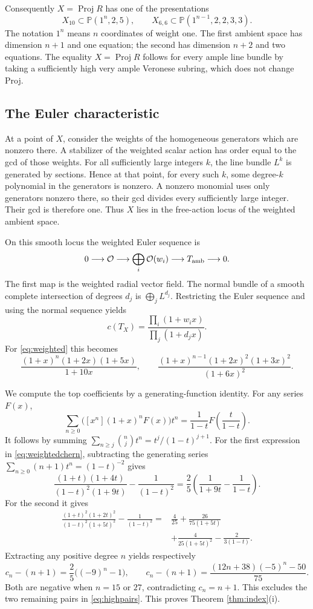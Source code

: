 \documentclass[11pt,reqno,letterpaper]{amsart}
\newcommand{\PP}{\mathbb P}
\newcommand{\Proj}{\operatorname{Proj}}
\newcommand{\OO}{\mathcal O}
\theoremstyle{definition}
\numberwithin{equation}{section}
\begin{document}
Consequently $X=\Proj R$ has one of the presentations
\begin{equation}\label{eq:weighted}
 X_{10}\subset\PP(1^n,2,5),\qquad
 X_{6,6}\subset\PP(1^{n-1},2,2,3,3).
\end{equation}
The notation $1^n$ means $n$ coordinates of weight one.
The first ambient space has dimension $n+1$ and one equation;
the second has dimension $n+2$ and two equations.
The equality $X=\Proj R$ follows for every ample line bundle by taking a
sufficiently high very ample Veronese subring, which does not change Proj.

\subsection{The Euler characteristic}
At a point of $X$, consider the weights of the homogeneous generators
which are nonzero there. A stabilizer of the weighted scalar action has
order equal to the gcd of those weights.
For all sufficiently large integers $k$, the line bundle $L^k$ is generated
by sections. Hence at that point, for every such $k$, some degree-$k$
polynomial in the generators is nonzero. A nonzero monomial uses only
generators nonzero there, so their gcd divides every sufficiently large
integer. Their gcd is therefore one.
Thus $X$ lies in the free-action locus of the weighted ambient space.

On this smooth locus the weighted Euler sequence is
\[
 0\longrightarrow\OO\longrightarrow\bigoplus_i\OO(w_i)
 \longrightarrow T_{\rm amb}\longrightarrow0.
\]
The first map is the weighted radial vector field.
The normal bundle of a smooth complete intersection of degrees $d_j$
is $\bigoplus_j L^{d_j}$. Restricting the Euler sequence and using the
normal sequence yields
\[
 c(T_X)=\frac{\prod_i(1+w_i x)}{\prod_j(1+d_j x)}.
\]
For \eqref{eq:weighted} this becomes
\begin{equation}\label{eq:weightedchern}
 \frac{(1+x)^n(1+2x)(1+5x)}{1+10x},
 \qquad
 \frac{(1+x)^{n-1}(1+2x)^2(1+3x)^2}{(1+6x)^2}.
\end{equation}

We compute the top coefficients by a generating-function identity.
For any series $F(x)$,
\[
 \sum_{n\ge0}\bigl([x^n](1+x)^nF(x)\bigr)t^n
 =\frac1{1-t}F\!\left(\frac{t}{1-t}\right).
\]
It follows by summing $\sum_{n\ge j}\binom njt^n=t^j/(1-t)^{j+1}$.
For the first expression in \eqref{eq:weightedchern}, subtracting the
generating series $\sum_{n\ge0}(n+1)t^n=(1-t)^{-2}$ gives
\[
 \frac{(1+t)(1+4t)}{(1-t)^2(1+9t)}-\frac1{(1-t)^2}
 =\frac25\left(\frac1{1+9t}-\frac1{1-t}\right).
\]
For the second it gives
\[
\begin{aligned}
 \frac{(1+t)^2(1+2t)^2}{(1-t)^2(1+5t)^2}-\frac1{(1-t)^2}
 ={}&\frac4{25}+\frac{26}{75(1+5t)}\\
 &+\frac4{25(1+5t)^2}-\frac2{3(1-t)}.
\end{aligned}
\]
Extracting any positive degree $n$ yields respectively
\[
 c_n-(n+1)=\frac25\bigl((-9)^n-1\bigr),\qquad
 c_n-(n+1)=\frac{(12n+38)(-5)^n-50}{75}.
\]
Both are negative when $n=15$ or $27$, contradicting $c_n=n+1$.
This excludes the two remaining pairs in \eqref{eq:highpairs}.
This proves Theorem \ref{thm:index}\textup{(i)}.
\end{document}
